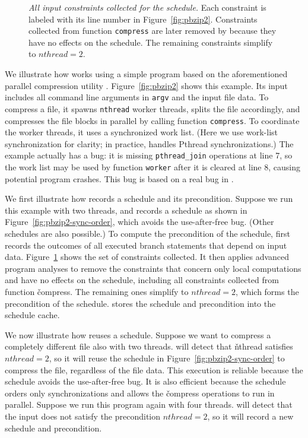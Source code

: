 \begin{figure}[t]
\centering
\begin{minipage}[c]{0.6\linewidth}
\tiny {}
\end{minipage}
\caption{{\it All input constraints collected for the schedule.}  Each
  constraint is labeled with its line number in
  Figure~\ref{fig:pbzip2}. Constraints collected from function
  \texttt{compress} are later removed by \tern because they have no effects on
  the schedule.  The remaining constraints simplify to
  $nthread=2$.} \label{fig:pbzip2-constraints}
\end{figure}

We illustrate how \tern works using a simple program based on the
aforementioned parallel compression utility \pbzip.
Figure~\ref{fig:pbzip2} shows this example. Its input includes all command
line arguments in \texttt{argv} and the input file data.
To compress a file, it spawns \texttt{nthread} worker threads,
splits the file accordingly, and compresses the file blocks in parallel by
calling function \texttt{compress}. To coordinate the worker threads, it uses a
synchronized work list. (Here we use work-list synchronization for
clarity; in practice, \tern handles Pthread synchronizations.) The example
actually has a bug: it is missing \texttt{pthread\_join} operations at line 7,
so the work list may be used by function \texttt{worker} after it is cleared at
line 8, causing potential program crashes. This bug is based on a real
bug in \pbzip.

We first illustrate how \tern records a schedule and its precondition.
Suppose we run this example with two threads, and \tern records a schedule
as shown in Figure~\ref{fig:pbzip2-sync-order}, which avoids the
use-after-free bug.  (Other schedules are also possible.)
To compute the precondition of the schedule, \tern first records the
outcomes of all executed branch statements that depend on input data.
Figure~\ref{fig:pbzip2-constraints} shows the set of constraints
collected.  It then applies advanced program analyses to remove the
constraints that concern only local computations and have no effects on
the schedule, including all constraints collected from function
\v{compress}.  The remaining ones simplify to $nthread=2$, which forms the
precondition of the schedule.  \tern stores the schedule and precondition
into the schedule cache.

We now illustrate how \tern reuses a schedule.  Suppose we want to
compress a completely different file also with two threads.  \tern will
detect that \v{nthread} satisfies $nthread=2$, so it will reuse the
schedule in Figure~\ref{fig:pbzip2-sync-order} to compress the file,
regardless of the file data.  This execution is reliable because the
schedule avoids the use-after-free bug.  It is also efficient because the
schedule orders only synchronizations and allows the \v{compress}
operations to run in parallel.  Suppose we run this program again with
four threads.  \tern will detect that the input does not satisfy the
precondition $nthread=2$, so it will record a new schedule and
precondition.


